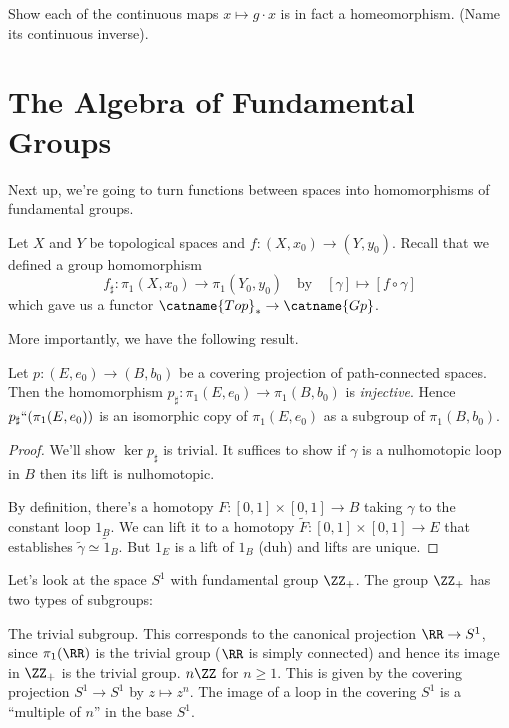 \begin{ques}
	Show each of the continuous maps $x \mapsto g \cdot x$ is in fact a homeomorphism.
	(Name its continuous inverse).
\end{ques}

\section{The Algebra of Fundamental Groups}
Next up, we're going to turn functions between spaces into homomorphisms of fundamental groups.

Let $X$ and $Y$ be topological spaces and $f : (X, x_0) \to (Y, y_0)$.
Recall that we defined a group homomorphism
\[ f_\sharp : \pi_1(X, x_0) \to \pi_1(Y_0, y_0) 
	\quad\text{by}\quad
	[\gamma] \mapsto [f \circ \gamma] \]
which gave us a functor $\catname{Top}_\ast \to \catname{Gp}$.

More importantly, we have the following result.
\begin{proposition}
	Let $p : (E,e_0) \to (B,b_0)$ be a covering projection of path-connected spaces.
	Then the homomorphism $p_\sharp : \pi_1(E, e_0) \to \pi_1(B, b_0)$ is \emph{injective}.
	Hence $p_\sharp ``(\pi_1(E, e_0))$ is an isomorphic copy of $\pi_1(E, e_0)$ 
	as a subgroup of $\pi_1(B, b_0)$.
\end{proposition}
\begin{proof}
	We'll show $\ker p_\sharp$ is trivial.
	It suffices to show if $\gamma$ is a nulhomotopic loop in $B$ 
	then its lift is nulhomotopic.

	By definition, there's a homotopy $F : [0,1] \times [0,1] \to B$
	taking $\gamma$ to the constant loop $1_B$.
	We can lift it to a homotopy $\tilde F : [0,1] \times [0,1] \to E$
	that establishes $\tilde\gamma \simeq \tilde 1_B$.
	But $1_E$ is a lift of $1_B$ (duh) and lifts are unique.
\end{proof}

\begin{example}[Subgroups of $\ZZ_+$]
	Let's look at the space $S^1$ with fundamental group $\ZZ_+$.
	The group $\ZZ_+$ has two types of subgroups:
	\begin{itemize}
		\ii The trivial subgroup.
		This corresponds to the canonical projection $\RR \to S^1$,
		since $\pi_1(\RR)$ is the trivial group ($\RR$ is simply connected)
		and hence its image in $\ZZ_+$ is the trivial group.
		\ii $n\ZZ$ for $n \ge 1$.
		This is given by the covering projection $S^1 \to S^1$
		by $z \mapsto z^n$.
		The image of a loop in the covering $S^1$ is a ``multiple of $n$''
		in the base $S^1$.
	\end{itemize}
\end{example}

